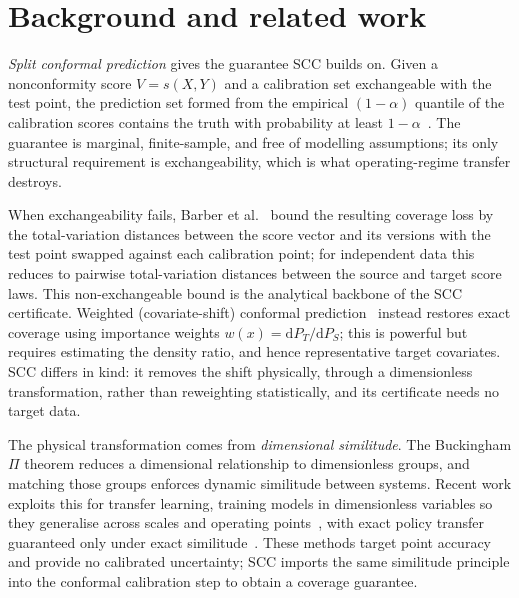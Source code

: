 \documentclass[review,times]{elsarticle}
\theoremstyle{definition}
\theoremstyle{remark}
\begin{document}
\section{Background and related work}\label{sec:background}
\emph{Split conformal prediction} gives the guarantee SCC builds on. Given a nonconformity score
$V=s(X,Y)$ and a calibration set exchangeable with the test point, the prediction set formed from
the empirical $(1-\alpha)$ quantile of the calibration scores contains the truth with probability at
least $1-\alpha$~\cite{papadopoulos2002inductive,lei2018distribution}. The guarantee is marginal,
finite-sample, and free of modelling assumptions; its only structural requirement is
exchangeability, which is what operating-regime transfer destroys.

When exchangeability fails, Barber et al.~\cite{barber2023conformal} bound the resulting coverage
loss by the total-variation distances between the score vector and its versions with the test point
swapped against each calibration point; for independent data this reduces to pairwise
total-variation distances between the source and target score laws. This non-exchangeable bound is
the analytical backbone of the SCC certificate. Weighted (covariate-shift) conformal
prediction~\cite{tibshirani2019conformal} instead restores exact coverage using importance weights
$w(x)=\mathrm{d}P_T/\mathrm{d}P_S$; this is powerful but requires estimating the density ratio, and
hence representative target covariates. SCC differs in kind: it removes the shift physically, through
a dimensionless transformation, rather than reweighting statistically, and its certificate needs no
target data.

The physical transformation comes from \emph{dimensional similitude}. The Buckingham $\Pi$ theorem
reduces a dimensional relationship to dimensionless groups, and matching those groups enforces
dynamic similitude between systems. Recent work exploits this for transfer learning, training models
in dimensionless variables so they generalise across scales and operating
points~\cite{oppenheimer2023multiscale,therrien2024buckingham}, with exact policy transfer
guaranteed only under exact similitude~\cite{girard2024dimensionless}. These methods target point
accuracy and provide no calibrated uncertainty; SCC imports the same similitude principle into the
conformal calibration step to obtain a coverage guarantee.
\end{document}
